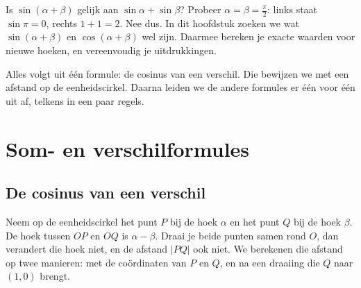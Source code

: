 %



Is $\sin(\alpha + \beta)$ gelijk aan $\sin\alpha + \sin\beta$? Probeer $\alpha = \beta = \frac{\pi}{2}$: links staat $\sin\pi = 0$, rechts $1 + 1 = 2$. Nee dus. In dit hoofdstuk zoeken we wat $\sin(\alpha + \beta)$ en $\cos(\alpha + \beta)$ wel zijn. Daarmee bereken je exacte waarden voor nieuwe hoeken, en vereenvoudig je uitdrukkingen.

Alles volgt uit één formule: de cosinus van een verschil. Die bewijzen we met een afstand op de eenheidscirkel. Daarna leiden we de andere formules er één voor één uit af, telkens in een paar regels.

\begin{oefeningen}[Start]

\end{oefeningen}

\section{Som- en verschilformules}

\subsection{De cosinus van een verschil}

Neem op de eenheidscirkel het punt $P$ bij de hoek $\alpha$ en het punt $Q$ bij de hoek $\beta$. De hoek tussen $OP$ en $OQ$ is $\alpha - \beta$. Draai je beide punten samen rond $O$, dan verandert die hoek niet, en de afstand $|PQ|$ ook niet. We berekenen die afstand op twee manieren: met de coördinaten van $P$ en $Q$, en na een draaiing die $Q$ naar $(1, 0)$ brengt.


